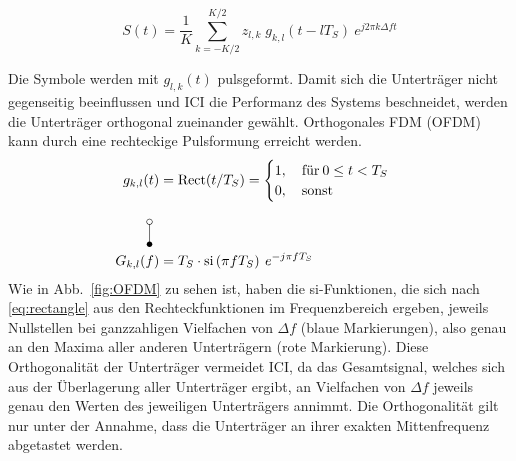 \begin{equation}
    S(t) = \frac{1}{K} \sum \limits_{k=-K/2}^{K/2} z_{l,k} \; g_{k,l}(t-lT_S) \: e^{j2\pi k \Delta f t}
\label{eq:ofdm_dft}
\end{equation}

Die Symbole werden mit $g_{l,k}(t)$ pulsgeformt. Damit sich die Unterträger nicht gegenseitig beeinflussen und \ac{ICI} die Performanz des Systems beschneidet, werden die Unterträger orthogonal zueinander gewählt. Orthogonales \ac{FDM} (OFDM) kann durch eine rechteckige Pulsformung erreicht werden. 
\begin{equation}
\label{eq:rectangle}
\begin{aligned}
g_{k,l}(t) &= \text{Rect}(t/T_S) = 
    \begin{cases}
    1, \quad \text{für} \: 0 \leq t < T_S \\
    0, \quad \text{sonst}
    \end{cases}\\
\rotatebox{270}{\laplace} \\
G_{k,l}(f) &= T_S \cdot \text{si}\left(\pi f T_S\right)\: e^{-j \pi f T_S}
\end{aligned}
\end{equation}
Wie in Abb.~\ref{fig:OFDM} zu sehen ist, haben die si-Funktionen, die sich nach \ref{eq:rectangle} aus den Rechteckfunktionen im Frequenzbereich ergeben, jeweils Nullstellen bei ganzzahligen Vielfachen von $\Delta f$ (blaue Markierungen), also genau an den Maxima aller anderen Unterträgern (rote Markierung). Diese Orthogonalität der Unterträger vermeidet \ac{ICI}, da das Gesamtsignal, welches sich aus der Überlagerung aller Unterträger ergibt, an Vielfachen von $\Delta f$ jeweils genau den Werten des jeweiligen Unterträgers annimmt. Die Orthogonalität gilt nur unter der Annahme, dass die Unterträger an ihrer exakten Mittenfrequenz abgetastet werden.\\
